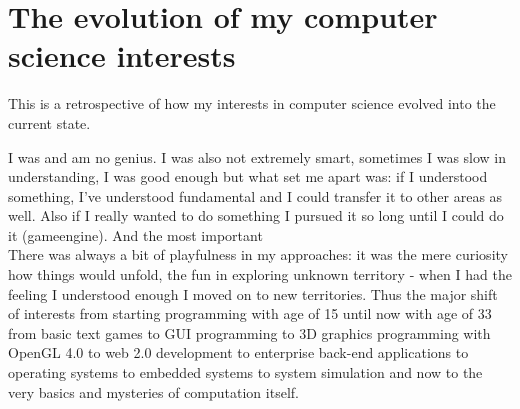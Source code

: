 \section{The evolution of my computer science interests}
\label{app:cs_interests}

This is a retrospective of how my interests in computer science evolved into the current state. \bigskip

I was and am no genius. I was also not extremely smart, sometimes I was slow in understanding, I was good enough but what set me apart was: if I understood something, I've understood fundamental and I could transfer it to other areas as well. Also if I really wanted to do something I pursued it so long until I could do it (gameengine). And the most important \\
There was always a bit of playfulness in my approaches: it was the mere curiosity how things would unfold, the fun in exploring unknown territory - when I had the feeling I understood enough I moved on to new territories. Thus the major shift of interests from starting programming with age of 15 until now with age of 33 from basic text games to GUI programming to 3D graphics programming with OpenGL 4.0 to web 2.0 development to enterprise back-end applications to operating systems to  embedded systems to system simulation and now to the very basics and mysteries of computation itself.

\bigskip
